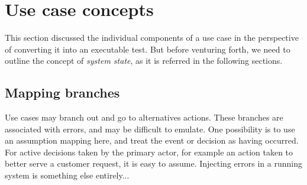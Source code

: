 \section{Use case concepts}
This section discussed the individual components of a use case in the perspective of converting it into an executable test. But before venturing forth, we need to outline the concept of \emph{system state}, as it is referred in the following sections.

\subsection{Mapping branches}
Use cases may branch out and go to alternatives actions. These branches are associated with errors, and may be difficult to emulate. One possibility is to use an assumption mapping here, and treat the event or decision as having occurred. For active decisions taken by the primary actor, for example an action taken to better serve a customer request, it is easy to assume. Injecting errors in a running system is something else entirely... %

